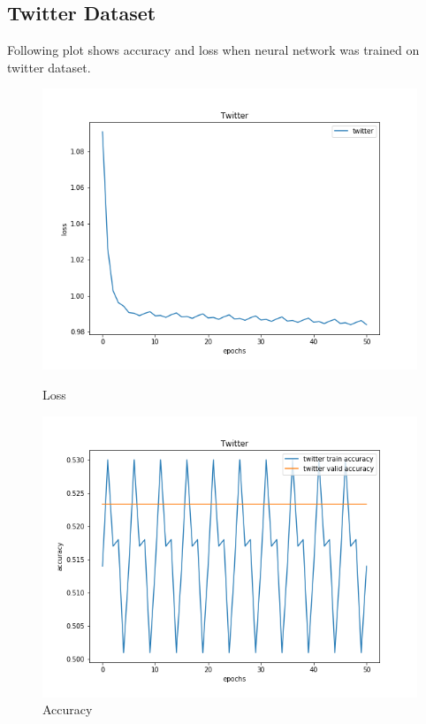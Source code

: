 \documentclass{article}
\begin{document}
\subsection{Twitter Dataset}
Following plot shows accuracy and loss when neural network was trained on twitter dataset.

\begin{figure}[!htb]
	\includegraphics[width=\linewidth]{../output_plots/part_3_twitter_loss.png}
	\caption{Loss}\label{fig:part_3_twitter_loss}
	\endminipage\hfill
	\includegraphics[width=\linewidth]{../output_plots/part_3_twitter_accuracy.png}
	\caption{Accuracy}\label{fig:part_3_twitter_accuracy}
	\endminipage\hfill
\end{figure}
\end{document}
